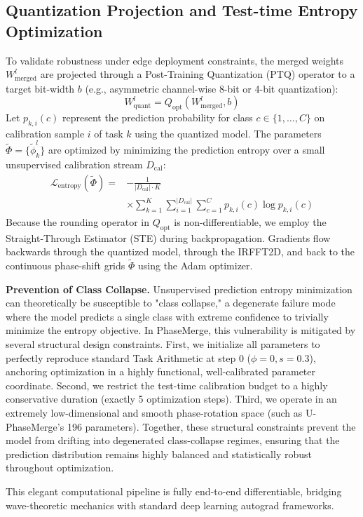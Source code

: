 \subsection{Quantization Projection and Test-time Entropy Optimization}
To validate robustness under edge deployment constraints, the merged weights $W^l_{\text{merged}}$ are projected through a Post-Training Quantization (PTQ) operator to a target bit-width $b$ (e.g., asymmetric channel-wise 8-bit or 4-bit quantization):
\begin{equation}
    W^l_{\text{quant}} = Q_{\text{opt}}(W^l_{\text{merged}}, b)
\end{equation}
Let $p_{k, i}(c)$ represent the prediction probability for class $c \in \{1, \dots, C\}$ on calibration sample $i$ of task $k$ using the quantized model. The parameters $\tilde{\Phi} = \{\tilde{\phi}_k^l\}$ are optimized by minimizing the prediction entropy over a small unsupervised calibration stream $D_{\text{cal}}$:
\begin{align}
    \mathcal{L}_{\text{entropy}}(\tilde{\Phi}) = &-\frac{1}{|D_{\text{cal}}| \cdot K} \nonumber \\
    &\times \sum_{k=1}^K \sum_{i=1}^{|D_{\text{cal}}|} \sum_{c=1}^C p_{k, i}(c) \log p_{k, i}(c)
\end{align}
Because the rounding operator in $Q_{\text{opt}}$ is non-differentiable, we employ the Straight-Through Estimator (STE) \cite{bengio2013estimating} during backpropagation. Gradients flow backwards through the quantized model, through the IRFFT2D, and back to the continuous phase-shift grids $\tilde{\Phi}$ using the Adam optimizer. 

\textbf{Prevention of Class Collapse.} Unsupervised prediction entropy minimization can theoretically be susceptible to "class collapse," a degenerate failure mode where the model predicts a single class with extreme confidence to trivially minimize the entropy objective. In PhaseMerge, this vulnerability is mitigated by several structural design constraints. First, we initialize all parameters to perfectly reproduce standard Task Arithmetic at step 0 ($\phi = 0, s = 0.3$), anchoring optimization in a highly functional, well-calibrated parameter coordinate. Second, we restrict the test-time calibration budget to a highly conservative duration (exactly 5 optimization steps). Third, we operate in an extremely low-dimensional and smooth phase-rotation space (such as U-PhaseMerge's 196 parameters). Together, these structural constraints prevent the model from drifting into degenerated class-collapse regimes, ensuring that the prediction distribution remains highly balanced and statistically robust throughout optimization.

This elegant computational pipeline is fully end-to-end differentiable, bridging wave-theoretic mechanics with standard deep learning autograd frameworks.
